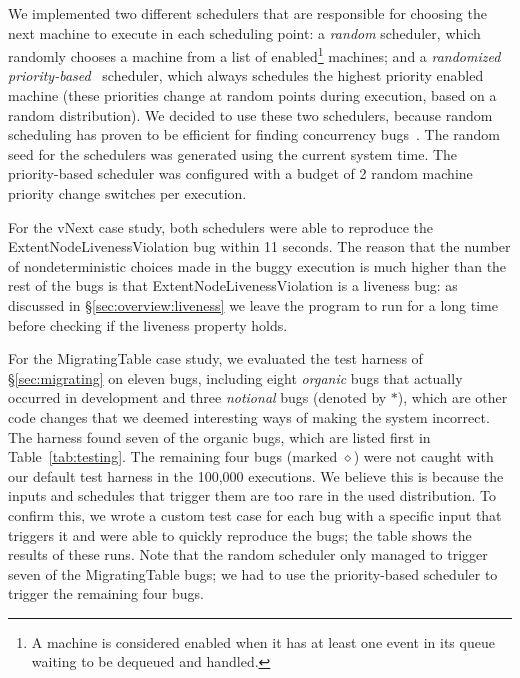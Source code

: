 We implemented two different schedulers that are responsible for choosing the next \psharp machine to execute in each scheduling point: a \emph{random} scheduler, which randomly chooses a machine from a list of enabled\footnote{A \psharp machine is considered enabled when it has at least one event in its queue waiting to be dequeued and handled.} machines; and a \emph{randomized priority-based}~\cite{burckhardt2010pct} scheduler, which always schedules the highest priority enabled machine (these priorities change at random points during execution, based on a random distribution). We decided to use these two schedulers, because random scheduling has proven to be efficient for finding concurrency bugs~\cite{thomson2014sct, deligiannis2015psharp}. The random seed for the schedulers was generated using the current system time. The priority-based scheduler was configured with a budget of 2 random machine priority change switches per execution.

For the vNext case study, both schedulers were able to reproduce the ExtentNodeLivenessViolation bug within 11 seconds. The reason that the number of nondeterministic choices made in the buggy execution is much higher than the rest of the bugs is that ExtentNodeLivenessViolation is a liveness bug: as discussed in \S\ref{sec:overview:liveness} we leave the program to run for a long time before checking if the liveness property holds.

For the MigratingTable case study, we evaluated the \psharp test harness of \S\ref{sec:migrating} on eleven bugs, including eight \emph{organic} bugs that actually occurred in development and three \emph{notional} bugs (denoted by $*$), which are other code changes that we deemed interesting ways of making the system incorrect. The harness found seven of the organic bugs, which are listed first in Table~\ref{tab:testing}. The remaining four bugs (marked $\diamond$) were not caught with our default test harness in the 100,000 executions. We believe this is because the inputs and schedules that trigger them are too rare in the used distribution. To confirm this, we wrote a custom test case for each bug with a specific input that triggers it and were able to quickly reproduce the bugs; the table shows the results of these runs. Note that the random scheduler only managed to trigger seven of the MigratingTable bugs; we had to use the priority-based scheduler to trigger the remaining four bugs.

